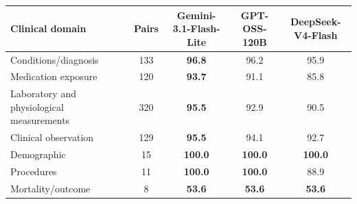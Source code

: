 \begin{tabular}{p{4.0cm}cccc}
\toprule
\textbf{Clinical domain} & \textbf{Pairs} & \textbf{Gemini-3.1-Flash-Lite} & \textbf{GPT-OSS-120B} & \textbf{DeepSeek-V4-Flash} \\
\midrule
Conditions/diagnosis & 133 & \textbf{96.8} & 96.2 & 95.9 \\
Medication exposure & 120 & \textbf{93.7} & 91.1 & 85.8 \\
Laboratory and physiological measurements & 320 & \textbf{95.5} & 92.9 & 90.5 \\
Clinical observation & 129 & \textbf{95.5} & 94.1 & 92.7 \\
Demographic & 15 & \textbf{100.0} & \textbf{100.0} & \textbf{100.0} \\
Procedures & 11 & \textbf{100.0} & \textbf{100.0} & 88.9 \\
Mortality/outcome & 8 & \textbf{53.6} & \textbf{53.6} & \textbf{53.6} \\
\bottomrule
\end{tabular}
